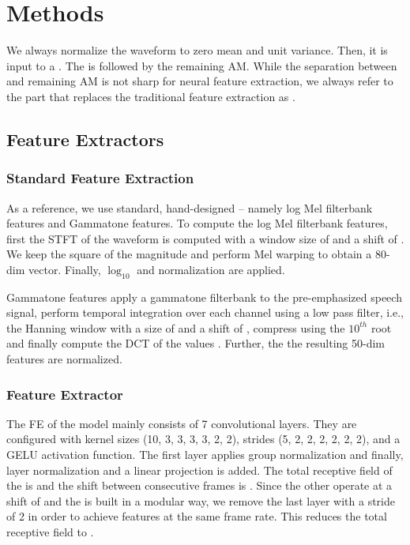\documentclass{INTERSPEECH2023}
\begin{document}
\section{Methods}
We always normalize the waveform to zero mean and unit variance.
Then, it is input to a \fe.
The \fe is followed by the remaining \gls{AM}.
While the separation between \fe and remaining \gls{AM} is not sharp for neural feature extraction, we always refer to the part that replaces the traditional feature extraction as \fe.

\subsection{Feature Extractors}
\subsubsection{Standard Feature Extraction}
As a reference, we use standard, hand-designed \fes -- namely log Mel filterbank features and Gammatone features.
To compute the log Mel filterbank features, first the \gls{STFT} of the waveform is computed with a window size of  and a shift of .
We keep the square of the magnitude and perform Mel warping to obtain a 80-dim vector.
Finally, $\log_{10}$ and normalization are applied.

Gammatone features apply a gammatone filterbank to the pre-emphasized speech signal, perform temporal integration over each channel using a low pass filter, i.e., the Hanning window with a size of  and a shift of , compress using the $10^{th}$ root and finally compute the \gls{DCT} of the values \cite{schlueter:icassp07}.
Further, the the resulting 50-dim features are normalized.

\subsubsection{\wvtwo Feature Extractor}
The \gls{FE} of the \wvtwo model \cite{facebook2020wav2vec2} mainly consists of 7 convolutional layers.
They are configured with kernel sizes (10, 3, 3, 3, 3, 2, 2), strides (5, 2, 2, 2, 2, 2, 2), and a GELU activation function.
The first layer applies group normalization and finally, layer normalization and a linear projection is added.
The total receptive field of the \wvtwo \fe is  and the shift between consecutive frames is .
Since the other \fes operate at a shift of  and the \wvtwo \fe is built in a modular way, we remove the last layer with a stride of 2 in order to achieve features at the same frame rate.
This reduces the total receptive field to .
\end{document}
